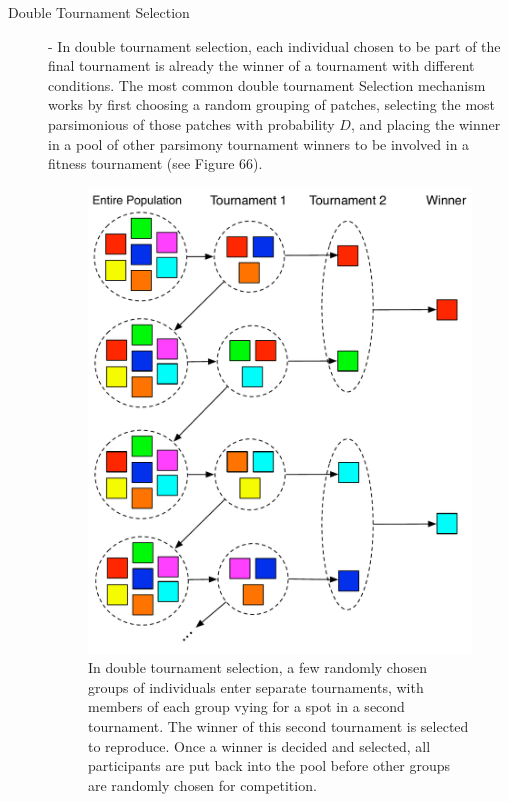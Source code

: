 \documentclass[12pt]{report} 	%
\numberwithin{figure}{chapter}
\numberwithin{table}{chapter}
\numberwithin{equation}{chapter}
\begin{document}
\begin{flushleft}
\begin{description}
\item [Double Tournament Selection] - In double tournament selection, each individual chosen to be part of the final tournament is already the winner of a tournament with different conditions. The most common double tournament Selection mechanism works by first choosing a random grouping of patches, selecting the most parsimonious of those patches with probability $D$, and placing the winner in a pool of other parsimony tournament winners to be involved in a fitness tournament (see Figure 66).
\\
\vspace{12pt}
\begin{figure}[h!]
\begin{center}
\includegraphics[scale = 0.7]{DoubleTournamentSelection}
\caption[Double tournament selection]{In double tournament selection, a few randomly chosen groups of individuals enter separate tournaments, with members of each group vying for a spot in a second tournament. The winner of this second tournament is selected to reproduce. Once a winner is decided and selected, all participants are put back into the pool before other groups are randomly chosen for competition.}
\end{center}
\end{figure}


\end{description}
\end{flushleft}
\end{document}

